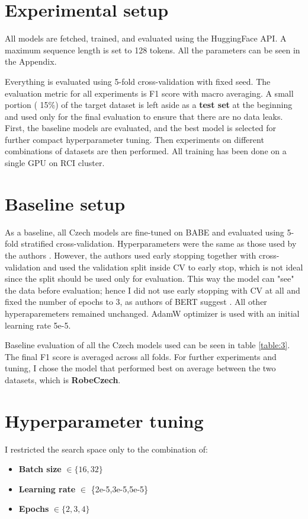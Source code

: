 \section{Experimental setup}
All models are fetched, trained, and evaluated using the HuggingFace API. A maximum sequence length is set to 128 tokens. All the parameters can be seen in the Appendix. 

Everything is evaluated using 5-fold cross-validation with fixed seed. The evaluation metric for all experiments is F1 score with macro averaging. A small portion ( 15\%) of the target dataset is left aside as a \textbf{test set} at the beginning and used only for the final evaluation to ensure that there are no data leaks.
First, the baseline models are evaluated, and the best model is selected for further compact hyperparameter tuning. Then experiments on different combinations of datasets are then performed.
All training has been done on a single GPU on RCI cluster.





 \section{Baseline setup}
 As a baseline, all Czech models are fine-tuned on BABE and evaluated using 5-fold stratified cross-validation. Hyperparameters were the same as those used by the authors \cite{Spinde2021MBIC}. However, the authors used early stopping together with cross-validation and used the validation split inside CV to early stop, which is not ideal since the split should be used only for evaluation. This way the model can "see" the data before evaluation; hence I did not use early stopping with CV at all and fixed the number of epochs to 3, as authors of BERT suggest \cite{devlin2019bert} . 
 All other hyperaparemeters remained unchanged. AdamW optimizer is used with an initial learning rate 5e-5. 
 
 Baseline evaluation of all the Czech models used can be seen in table \ref{table:3}. The final F1 score is averaged across all folds. For further experiments and tuning, I chose the model that performed best on average between the two datasets, which is \textbf{RobeCzech}.
 

 
 

 
 
 
 
 
 \section{Hyperparameter tuning}
I restricted the search space only to the combination of:
 \begin{itemize}
     \item \textbf{Batch size} $\in \{16,32\}$
     \item \textbf{Learning rate} $\in $ \{2e-5,3e-5,5e-5\}
     \item \textbf{Epochs} $\in \{2,3,4\}$
 \end{itemize}
 

